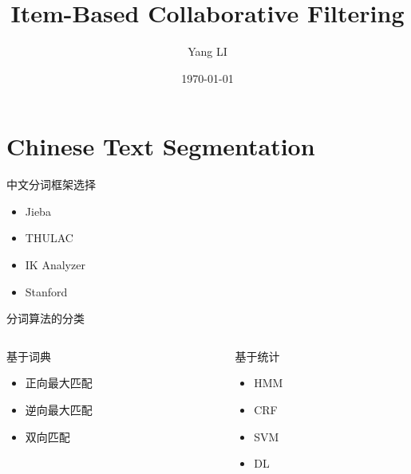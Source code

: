 \documentclass{beamer}
\title{Item-Based Collaborative Filtering}
\date{\today}
\author{Yang LI}
\institute{School of Software Engineering, Tongji University}
\begin{document}
  \maketitle
  \section{Chinese Text Segmentation}
  \begin{frame}{中文分词框架选择}
  \begin{itemize}
    \item Jieba
    \item THULAC
    \item IK Analyzer
    \item Stanford
  \end{itemize}
  \end{frame}
  \begin{frame}{分词算法的分类}
    \begin{columns}
      \begin{column}{0.5\textwidth}
          基于词典
          \begin{itemize}
            \item 正向最大匹配
            \item 逆向最大匹配
            \item 双向匹配
          \end{itemize}
      \end{column}
      \begin{column}{0.5\textwidth}
        基于统计
        \begin{itemize}
          \item HMM
          \item CRF
          \item SVM
          \item DL
        \end{itemize}
      \end{column}
    \end{columns}
  \end{frame}
\end{document}
